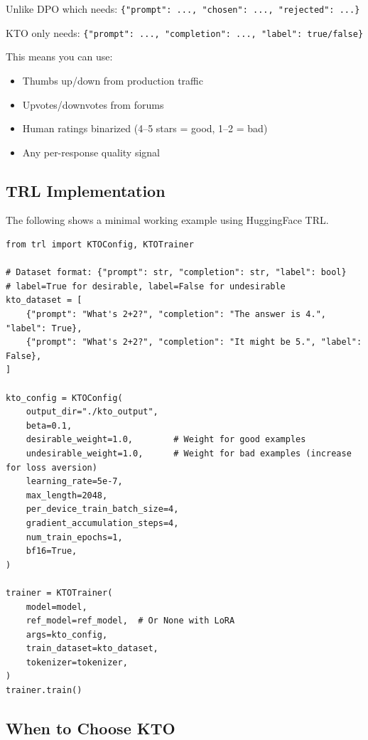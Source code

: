 \begin{examplebox}
Unlike DPO which needs: \verb|{"prompt": ..., "chosen": ..., "rejected": ...}|

KTO only needs: \verb|{"prompt": ..., "completion": ..., "label": true/false}|

This means you can use:

\begin{itemize}
  \item Thumbs up/down from production traffic
  \item Upvotes/downvotes from forums
  \item Human ratings binarized (4--5 stars = good, 1--2 = bad)
  \item Any per-response quality signal
\end{itemize}
\end{examplebox}

\subsection{TRL Implementation}
\label{trl-implementation-1}

The following shows a minimal working example using HuggingFace TRL.

\begin{lstlisting}[style=pythonstyle]
from trl import KTOConfig, KTOTrainer

# Dataset format: {"prompt": str, "completion": str, "label": bool}
# label=True for desirable, label=False for undesirable
kto_dataset = [
    {"prompt": "What's 2+2?", "completion": "The answer is 4.", "label": True},
    {"prompt": "What's 2+2?", "completion": "It might be 5.", "label": False},
]

kto_config = KTOConfig(
    output_dir="./kto_output",
    beta=0.1,
    desirable_weight=1.0,        # Weight for good examples
    undesirable_weight=1.0,      # Weight for bad examples (increase for loss aversion)
    learning_rate=5e-7,
    max_length=2048,
    per_device_train_batch_size=4,
    gradient_accumulation_steps=4,
    num_train_epochs=1,
    bf16=True,
)

trainer = KTOTrainer(
    model=model,
    ref_model=ref_model,  # Or None with LoRA
    args=kto_config,
    train_dataset=kto_dataset,
    tokenizer=tokenizer,
)
trainer.train()
\end{lstlisting}

\subsection{When to Choose KTO}
\label{when-to-choose-kto}


